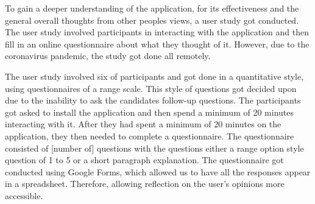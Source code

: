 		To gain a deeper understanding of the application, for its effectiveness and the general overall thoughts from other peoples views, a user study got conducted. The user study involved participants in interacting with the application and then fill in an online questionnaire about what they thought of it. However, due to the coronavirus pandemic, the study got done all remotely.
		
		The user study involved six of participants and got done in a quantitative style, using questionnaires of a range scale. This style of questions got decided upon due to the inability to ask the candidates follow-up questions. The participants got asked to install the application and then spend a minimum of 20 minutes interacting with it. After they had spent a minimum of 20 minutes on the application, they then needed to complete a questionnaire. The questionnaire consisted of [number of] questions with the questions either a range option style question of 1 to 5 or a short paragraph explanation. The questionnaire got conducted using Google Forms, which allowed us to have all the responses appear in a spreadsheet. Therefore, allowing reflection on the user's opinions more accessible.
		